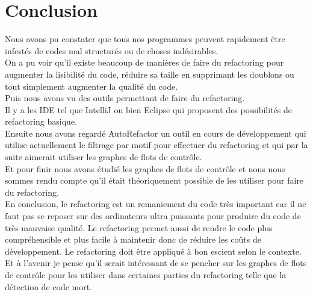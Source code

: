 \documentclass[a4paper,twoside,12pt,openright]{report}
\begin{document}
\chapter{Conclusion}
Nous avons pu constater que tous nos programmes peuvent rapidement être infestés de codes mal structurés ou de choses indésirables.\\
On a pu voir qu'il existe beaucoup de manières de faire du refactoring pour augmenter la lisibilité du code, réduire sa taille en supprimant les doublons ou tout simplement augmenter la qualité du code.\\
Puis nous avons vu des outils permettant de faire du refactoring.\\
Il y a les IDE tel que IntelliJ ou bien Eclipse qui proposent des possibilités de refactoring basique.\\
Ensuite nous avons regardé AutoRefactor un outil en cours de développement qui utilise actuellement le filtrage par motif pour effectuer du refactoring et qui par la suite aimerait utiliser les graphes de flots de contrôle.\\
Et pour finir nous avons étudié les graphes de flots de contrôle et nous nous sommes rendu compte qu'il était théoriquement possible de les utiliser pour faire du refactoring.\\
En conclusion, le refactoring est un remaniement du code très important car il ne faut pas se reposer sur des ordinateurs ultra puissants pour produire du code de très mauvaise qualité. Le refactoring permet aussi de rendre le code plus compréhensible et plus facile à maintenir donc de réduire les coûts de développement.
Le refactoring doit être appliqué à bon escient selon le contexte.\\
Et à l'avenir je pense qu'il serait intéressant de se pencher sur les graphes de flots de contrôle pour les utiliser dans certaines parties du refactoring telle que la détection de code mort.\\




\end{document}
